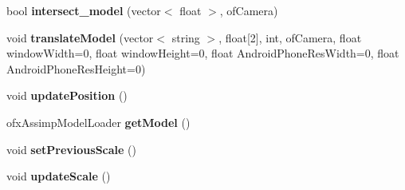 \begin{DoxyCompactItemize}
\item 
\hypertarget{class_models_a632c8e7e02ce8a2517e1c14f3a89d0dd}{bool {\bfseries intersect\-\_\-model} (vector$<$ float $>$, of\-Camera)}\label{class_models_a632c8e7e02ce8a2517e1c14f3a89d0dd}

\item 
\hypertarget{class_models_ae50be1dc201f4588591d1730ad037586}{void {\bfseries translate\-Model} (vector$<$ string $>$, float\mbox{[}2\mbox{]}, int, of\-Camera, float window\-Width=0, float window\-Height=0, float Android\-Phone\-Res\-Width=0, float Android\-Phone\-Res\-Height=0)}\label{class_models_ae50be1dc201f4588591d1730ad037586}

\item 
\hypertarget{class_models_a2fd1b0fa533ac2a311147826e90c7269}{void {\bfseries update\-Position} ()}\label{class_models_a2fd1b0fa533ac2a311147826e90c7269}

\item 
\hypertarget{class_models_a2c32fc17c18d9633ef5e7aa4c2b8a12d}{ofx\-Assimp\-Model\-Loader {\bfseries get\-Model} ()}\label{class_models_a2c32fc17c18d9633ef5e7aa4c2b8a12d}

\item 
\hypertarget{class_models_a04cc8e225838e9f9d9c0afbefb218457}{void {\bfseries set\-Previous\-Scale} ()}\label{class_models_a04cc8e225838e9f9d9c0afbefb218457}

\item 
\hypertarget{class_models_afd86176c58ba4385d015040cd66fa183}{void {\bfseries update\-Scale} ()}\label{class_models_afd86176c58ba4385d015040cd66fa183}

\end{DoxyCompactItemize}
